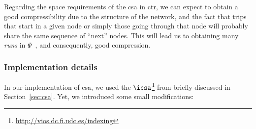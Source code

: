 
	Regarding the space requirements of the \gls{csa} in \gls{ctr}, we can expect to obtain a good compressibility
	due to the structure of the network, and the fact that trips that start in a given node or simply
	those going through that node will probably share the same sequence of ``next'' nodes. This will
	lead us to obtaining many {\em runs} in $\Psi$~\cite{NM07}, and consequently, good compression.

	\subsubsection{Implementation details} In our implementation of \gls{csa}, we used the 
	$\icsa$\footnote{\url{http://vios.dc.fi.udc.es/indexing}} from \cite{FBNCPR12} briefly discussed 
	in Section~\ref{sec:csa}. Yet, we introduced some small modifications:

